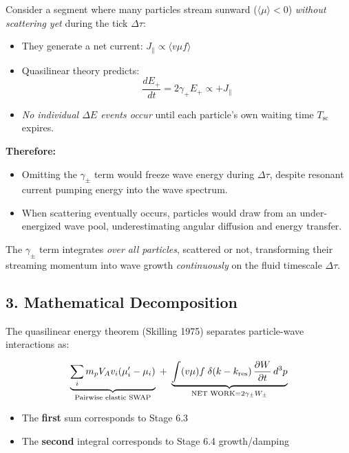 {Consider a segment where many particles stream sunward (\( \langle \mu \rangle < 0 \)) \emph{without scattering yet} during the tick \( \Delta \tau \):

\begin{itemize}
  \item They generate a net current: \( J_{\parallel} \propto \langle v \mu f \rangle \)
  \item Quasilinear theory predicts:
  \[
    \frac{dE_+}{dt} = 2\gamma_+ E_+ \propto +J_{\parallel}
  \]
  \item \emph{No individual \( \Delta E \) events occur} until each particle’s own waiting time \( T_{\text{sc}} \) expires.
\end{itemize}

\textbf{Therefore:}

\begin{itemize}
  \item Omitting the \( \gamma_\pm \) term would freeze wave energy during \( \Delta \tau \), despite resonant current pumping energy into the wave spectrum.
  \item When scattering eventually occurs, particles would draw from an under-energized wave pool, underestimating angular diffusion and energy transfer.
\end{itemize}

The \( \gamma_\pm \) term integrates \emph{over all particles}, scattered or not, transforming their streaming momentum into wave growth \emph{continuously} on the fluid timescale \( \Delta \tau \).

\subsection*{3. Mathematical Decomposition}

The quasilinear energy theorem (Skilling 1975) separates particle-wave interactions as:

\[
\underbrace{\sum_i m_p V_A v_i (\mu'_i - \mu_i)}_{\text{Pairwise elastic SWAP}}
\;+\;
\underbrace{\int (v\mu)f\;
            \delta(k - k_{\rm res})\,
            \frac{\partial W}{\partial t} \, d^3p}_{\text{NET WORK} = 2\gamma_\pm W_\pm}
\]

\begin{itemize}
  \item The \textbf{first} sum corresponds to Stage 6.3
  \item The \textbf{second} integral corresponds to Stage 6.4 growth/damping
\end{itemize}

}
